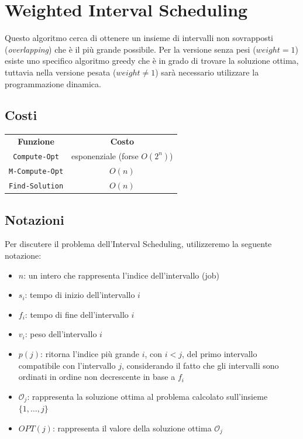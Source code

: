 \section{Weighted Interval Scheduling}

Questo algoritmo cerca di ottenere un insieme di intervalli non sovrapposti
(\textit{overlapping}) che è il più grande possibile. Per la versione senza pesi
($weight = 1$) esiste uno specifico algoritmo greedy che è in grado di trovare la
soluzione ottima, tuttavia nella versione pesata ($weight \neq 1$) sarà
necessario utilizzare la programmazione dinamica.

\subsection{Costi}

\begin{center}
    \begin{tabular}{|c|c|}
        \textbf{Funzione}    & \textbf{Costo}                \\
        \verb|Compute-Opt|   & esponenziale (forse $O(2^n)$) \\
        \verb|M-Compute-Opt| & $O(n)$                        \\
        \verb|Find-Solution| & $O(n)$
    \end{tabular}
\end{center}

\subsection{Notazioni}

Per discutere il problema dell'Interval Scheduling, utilizzeremo la seguente
notazione:

\begin{itemize}
    \item $n$: un intero che rappresenta l'indice dell'intervallo (job)
    \item $s_i$: tempo di inizio dell'intervallo $i$
    \item $f_i$: tempo di fine dell'intervallo $i$
    \item $v_i$: peso dell'intervallo $i$
    \item $p(j)$: ritorna l'indice più grande $i$, con $i < j$, del primo
          intervallo compatibile con l'intervallo $j$, considerando il fatto che gli
          intervalli sono ordinati in ordine non decrescente in base a $f_i$
    \item $\mathcal{O}_j$: rappresenta la soluzione ottima al problema calcolato
          sull'insieme $\{1, \ldots, j\}$
    \item $OPT(j)$: rappresenta il valore della soluzione ottima $\mathcal{O}_j$
\end{itemize}

